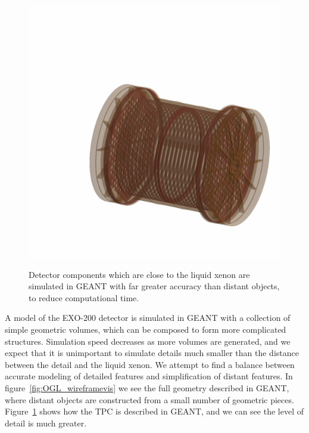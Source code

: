 \begin{figure}
\begin{center}
\includegraphics[keepaspectratio=true,width=\textwidth,clip=true,trim=90mm 50mm 10mm 130mm]{TPC_Cu_RayTracer.png}
\end{center}
\renewcommand{\baselinestretch}{1}
\small\normalsize
\begin{quote}
\caption{Detector components which are close to the liquid xenon are simulated in GEANT with far greater accuracy than distant objects, to reduce computational time.~\cite{MCDocumentRun2a}}
\label{fig:RayTracer_TPConly}
\end{quote}
\end{figure}
\renewcommand{\baselinestretch}{2}
\small\normalsize

A model of the EXO-200 detector is simulated in GEANT with a collection of simple geometric volumes, which can be composed to form more complicated structures.  Simulation speed decreases as more volumes are generated, and we expect that it is unimportant to simulate details much smaller than the distance between the detail and the liquid xenon.  We attempt to find a balance between accurate modeling of detailed features and simplification of distant features.  In figure~\ref{fig:OGL_wireframevis} we see the full geometry described in GEANT, where distant objects are constructed from a small number of geometric pieces.  Figure~\ref{fig:RayTracer_TPConly} shows how the TPC is described in GEANT, and we can see the level of detail is much greater.

